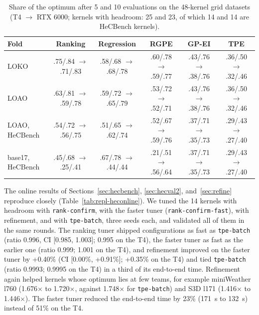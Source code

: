 \documentclass[10pt]{article}
\newcommand{\x}{\ensuremath{\times}}
\newcommand{\code}[1]{\texttt{#1}}
\begin{document}
\begin{table}[t]
\centering
\caption{Share of the optimum after 5 and 10 evaluations on the 48-kernel grid datasets
(T4 $\to$ RTX 6000; kernels with headroom: 25 and 23, of which 14 and 14 are HeCBench
kernels).}
\label{tab:repl-hec}
\footnotesize
\setlength{\tabcolsep}{3pt}
\begin{tabular}{lccccc}
\toprule
Fold & Ranking & Regression & RGPE & GP-EI & TPE \\
\midrule
LOKO & .75/.84 $\to$ .71/.83 & .58/.68 $\to$ .68/.78 & .60/.78 $\to$ .59/.77 & .43/.76 $\to$ .38/.76 & .36/.50 $\to$ .32/.46 \\
LOAO & .63/.81 $\to$ .59/.78 & .59/.72 $\to$ .65/.79 & .53/.72 $\to$ .52/.71 & .43/.76 $\to$ .38/.76 & .36/.50 $\to$ .32/.46 \\
LOAO, HeCBench & .54/.72 $\to$ .56/.75 & .51/.65 $\to$ .62/.74 & .52/.67 $\to$ .59/.76 & .37/.71 $\to$ .35/.73 & .29/.43 $\to$ .27/.40 \\
base17, HeCBench & .45/.68 $\to$ .25/.41 & .67/.78 $\to$ .44/.44 & .21/.51 $\to$ .56/.64 & .37/.71 $\to$ .35/.73 & .29/.43 $\to$ .27/.40 \\
\bottomrule
\end{tabular}
\end{table}

The online results of Sections~\ref{sec:hecbench}, \ref{sec:hecval2},
and~\ref{sec:refine} reproduce closely (Table~\ref{tab:repl-heconline}). We
tuned the 14 kernels with headroom with \code{rank-confirm}, with the faster
tuner (\code{rank-confirm-fast}), with refinement, and with \code{tpe-batch},
three seeds each, and validated all of them in the same rounds. The ranking
tuner shipped configurations as fast as \code{tpe-batch} (ratio 0.996, CI
[0.985, 1.003]; 0.995 on the T4), the faster tuner as fast as the earlier one
(ratio 0.999; 1.001 on the T4), and refinement improved on the faster tuner by
+0.40\% (CI [0.00\%, +0.91\%]; +0.35\% on the T4) and tied \code{tpe-batch}
(ratio 0.9993; 0.9995 on the T4) in a third of its end-to-end time.
Refinement again helped kernels whose optimum lies at few teams, for example
miniWeather l760 (1.676\x{} to 1.720\x{}, against 1.748\x{} for \code{tpe-batch})
and S3D l171 (1.416\x{} to 1.446\x{}). The faster tuner reduced the end-to-end time
by 23\% (171~s to 132~s) instead of 51\% on the T4.
\end{document}
